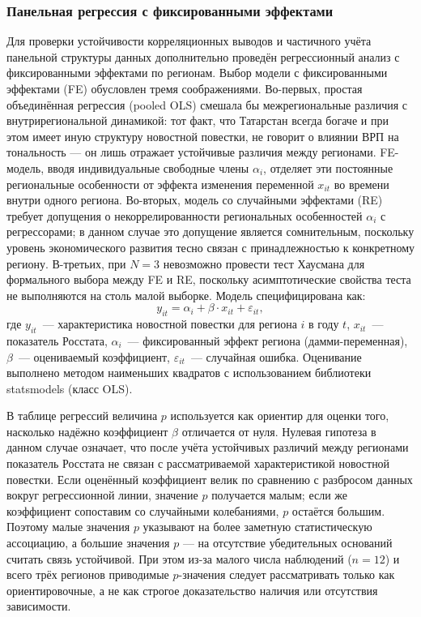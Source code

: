 \documentclass[master, och, coursework]{SCWorks1}
\begin{document}
\subsubsection{Панельная регрессия с фиксированными эффектами}
Для проверки устойчивости корреляционных выводов и частичного учёта панельной структуры данных дополнительно проведён регрессионный анализ с фиксированными эффектами по регионам. Выбор модели с фиксированными эффектами (FE) обусловлен тремя соображениями. Во-первых, простая объединённая регрессия (pooled OLS) смешала бы межрегиональные различия с внутрирегиональной динамикой: тот факт, что Татарстан всегда богаче и при этом имеет иную структуру новостной повестки, не говорит о влиянии ВРП на тональность — он лишь отражает устойчивые различия между регионами. FE-модель, вводя индивидуальные свободные члены $\alpha_i$, отделяет эти постоянные региональные особенности от эффекта изменения переменной $x_{it}$ во времени внутри одного региона. Во-вторых, модель со случайными эффектами (RE) требует допущения о некоррелированности региональных особенностей $\alpha_i$ с регрессорами; в данном случае это допущение является сомнительным, поскольку уровень экономического развития тесно связан с принадлежностью к конкретному региону. В-третьих, при $N=3$ невозможно провести тест Хаусмана для формального выбора между FE и RE, поскольку асимптотические свойства теста не выполняются на столь малой выборке. Модель специфицирована как:
\begin{equation}
y_{it} = \alpha_i + \beta \cdot x_{it} + \varepsilon_{it},
\end{equation}
где $y_{it}$~--- характеристика новостной повестки для региона $i$ в году $t$, $x_{it}$~--- показатель Росстата, $\alpha_i$~--- фиксированный эффект региона (дамми-переменная), $\beta$~--- оцениваемый коэффициент, $\varepsilon_{it}$~--- случайная ошибка. Оценивание выполнено методом наименьших квадратов с использованием библиотеки statsmodels (класс OLS).

В таблице регрессий величина $p$ используется как ориентир для оценки того, насколько надёжно коэффициент $\beta$ отличается от нуля. Нулевая гипотеза в данном случае означает, что после учёта устойчивых различий между регионами показатель Росстата не связан с рассматриваемой характеристикой новостной повестки. Если оценённый коэффициент велик по сравнению с разбросом данных вокруг регрессионной линии, значение $p$ получается малым; если же коэффициент сопоставим со случайными колебаниями, $p$ остаётся большим. Поэтому малые значения $p$ указывают на более заметную статистическую ассоциацию, а большие значения $p$ — на отсутствие убедительных оснований считать связь устойчивой. При этом из-за малого числа наблюдений ($n=12$) и всего трёх регионов приводимые $p$-значения следует рассматривать только как ориентировочные, а не как строгое доказательство наличия или отсутствия зависимости.
\end{document}
